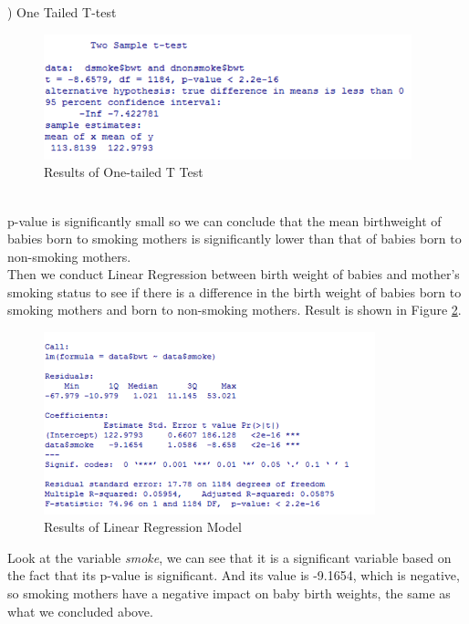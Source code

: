 \documentclass[oneside,12pt]{report}
\begin{document}
)	One Tailed T-test\\
\begin{figure}[htb]
    \begin{center}
        \includegraphics[width=0.95\textwidth]{onetailttest.png}
    \end{center}
    \caption{Results of One-tailed T Test}
    \label{fig:onetailttest}
\end{figure}\\
\indent p-value is significantly small so we can conclude that the mean birthweight of babies born to smoking mothers is significantly lower than that of babies born to non-smoking mothers.\\
\indent Then we conduct Linear Regression between birth weight of babies and mother’s smoking status to see if there is a difference in the birth weight of babies born to smoking mothers and born to non-smoking mothers. Result is shown in Figure \ref{fig:lrtest}.\\
\begin{figure}[htb]
    \begin{center}
        \includegraphics[width=0.855\textwidth]{lrtest.png}
    \end{center}
    \caption{Results of Linear Regression Model}
    \label{fig:lrtest}
\end{figure}
\indent Look at the variable \emph{smoke}, we can see that it is a significant variable based on the fact that its p-value is significant. And its value is -9.1654, which is negative, so smoking mothers have a negative impact on baby birth weights, the same as what we concluded above.\\
\end{document}
